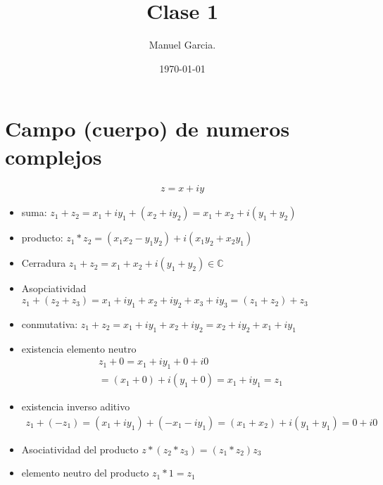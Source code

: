 \documentclass{article}
\title{Clase 1 }
\author{Manuel Garcia.}
\date{\today}
\newcommand{\caja}[3]{%
  \begin{tcolorbox}[colback=#1!5!white,colframe=#1!25!black,title=#2]
    #3
  \end{tcolorbox}%
}
\begin{document}
\maketitle

\section{Campo (cuerpo) de numeros complejos}
\caja{green}{Numero complejo y operaciones}{
  \begin{gather}
    z = x+iy 
    \label{eq:numero_complejo }
  \end{gather}
  \begin{itemize}
    \item suma: $z_1+z_2  = x_1+iy_1+(x_2+iy_2) =  x_1+x_2+i(y_1+y_2)$
    \item producto: $ z_1 * z_2 = (x_1x_2-y_1y_2)+i(x_1y_2+x_2y_1) $
  \end{itemize}
}
\caja{green}{Propiedades }{
  \begin{itemize}
    \item Cerradura $ z_1+z_2 = x_1+x_2 +i(y_1+y_2) \in \mathbb{C} $
    \item Asopciatividad $ z_1+(z_2+z_3) = x_1+iy_1+x_2+iy_2+x_3+iy_3 = (z_1+z_2)+z_3 $
    \item conmutativa: $ z_1+z_2 = x_1+iy_1+x_2+iy_2 = x_2+iy_2+x_1+iy_1 $
    \item existencia elemento neutro 
      \begin{gather}
         z_1+0 = x_1+iy_1+0+i0\\
         = (x_1+0)+i(y_1+0) = x_1+iy_1 = z_1
      \end{gather}
    \item existencia inverso aditivo
      \begin{gather}
         z_1+(-z_1) = (x_1+iy_1) + (-x_1-iy_1) = (x_1+x_2)+i(y_1+y_1) = 0 +i0
      \end{gather}
    \item Asociatividad del producto $ z * (z_2*z_3) = (z_1*z_2)z_3 $
    \item elemento neutro del producto $ z_1*1 = z_1 $
  \end{itemize}
}
\end{document}
